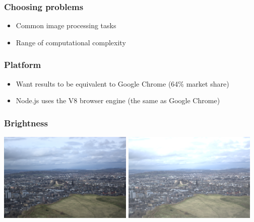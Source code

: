 \documentclass{beamer}
\begin{document}
\begin{frame}
    \frametitle{Choosing problems}
    \begin{itemize}
        \item Common image processing tasks
        \item Range of computational complexity
    \end{itemize}
\end{frame}

\begin{frame}
    \frametitle{Platform}
    \begin{itemize}
        \item Want results to be equivalent to Google Chrome (64\% market share)
        \item Node.js uses the V8 browser engine (the same as Google Chrome)
    \end{itemize}
\end{frame}

\begin{frame}
    \frametitle{Brightness}
    \begin{center}
        \includegraphics[width=0.48\textwidth]{default.png}
        \includegraphics[width=0.48\textwidth]{bright.png}
    \end{center}

\end{frame}
\end{document}
